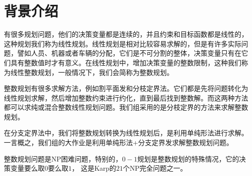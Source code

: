 \chapter{背景介绍}
有很多规划问题，他们的决策变量都是连续的，并且约束和目标函数都是线性的，这种规划我们称为线性规划。线性规划是相对比较容易求解的，但是有许多实际问题，譬如人员、机器或者车辆的分配，它们是不可分割的整体，决策变量只有在它们具有整数值时才有意义。在线性规划中，增加决策变量的整数限制，这种我们称为线性整数规划，一般情况下，我们会简称为整数规划。

整数规划有很多求解方法，例如割平面发和分枝定界法。它们都是先将问题转化为线性规划求解，然后增加整数约束进行约化，直到最后找到整数解。而这两种方法都可以求纯或混合整数线性规划问题。我们组采用的是分枝定界的方法来求解整数规划。

在分支定界法中，我们将整数规划转换为线性规划后，是利用单纯形法进行求解。一言概之，我们组的大作业是利用单纯形法+分支定界发求解整数规划问题。

整数规划问题是NP困难问题，特别的，$0-1$规划是整数规划的特殊情况，它的决策变量要么取$0$要么取$1$， 这是Karp的$21$个NP完全问题之一。\cite{ILP}

